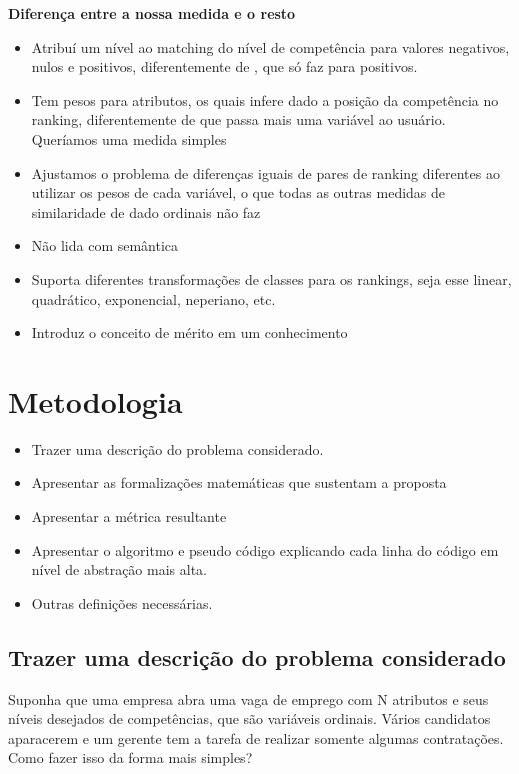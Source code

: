 \documentclass[preprint,12pt]{elsarticle}
\begin{document}
\textbf{Diferença entre a nossa medida e o resto}
\begin{itemize}
    \item Atribuí um nível ao matching do nível de competência para valores negativos, nulos e positivos, diferentemente de \cite{impact-semantic-web-2005}, que só faz para positivos.
    \item Tem pesos para atributos, os quais infere dado a posição da competência no ranking, diferentemente de \cite{impact-semantic-web-2005} que passa mais uma variável ao usuário. Queríamos uma medida simples
    \item Ajustamos o problema de diferenças iguais de pares de ranking diferentes ao utilizar os pesos de cada variável, o que todas as outras medidas de similaridade de dado ordinais não faz
    \item Não lida com semântica
    \item Suporta diferentes transformações de classes para os rankings, seja esse linear, quadrático, exponencial, neperiano, etc.
    \item Introduz o conceito de mérito em um conhecimento
\end{itemize}


\section{Metodologia}
\label{sec:sample3}
\begin{itemize}
\color{blue}
\item Trazer uma descrição do problema considerado. 
\item Apresentar as formalizações matemáticas que sustentam a proposta
\item Apresentar a métrica resultante
\item Apresentar o algoritmo e pseudo código explicando cada linha do código em nível de abstração mais alta. 
\item Outras definições necessárias.
\end{itemize}

\subsection{Trazer uma descrição do problema considerado}

Suponha que uma empresa abra uma vaga de emprego com N atributos e seus níveis desejados de competências, que são variáveis ordinais. Vários candidatos aparacerem e um gerente tem a tarefa de realizar somente algumas contratações. Como fazer isso da forma mais simples?
\end{document}

